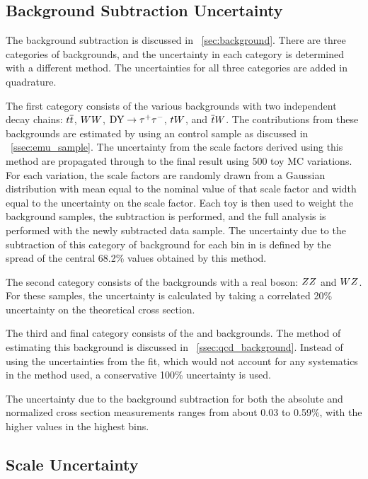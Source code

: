 \subsection{Background Subtraction Uncertainty}
\label{ssec:background_subtraction_uncertainty}

The background subtraction is discussed in \SEC~\ref{sec:background}. There are
three categories of backgrounds, and the uncertainty in each category is
determined with a different method. The uncertainties for all three categories
are added in quadrature.

The first category consists of the various backgrounds with two independent
decay chains: $t\overline{t}$, $WW$, $\text{DY} \to \tau^{+} \tau^{-}$, $tW$, and $\overline{t}W$. The
contributions from these backgrounds are estimated by using an \emu control
sample as discussed in \SEC~\ref{ssec:emu_sample}. The uncertainty from the
scale factors derived using this method are propagated through to the final
result using 500 toy MC variations. For each variation, the scale factors are
randomly drawn from a Gaussian distribution with mean equal to the nominal
value of that scale factor and width equal to the uncertainty on the scale
factor. Each toy is then used to weight the background samples, the subtraction
is performed, and the full analysis is performed with the newly subtracted data
sample. The uncertainty due to the subtraction of this category of background
for each bin in \phistar is defined by the spread of the central 68.2\% values
obtained by this method.

The second category consists of the backgrounds with a real \Z boson: $ZZ$
and $WZ$. For these samples, the uncertainty is calculated by taking a
correlated 20\% uncertainty on the theoretical cross section.

The third and final category consists of the \QCDjets and \wjets
backgrounds. The method of estimating this background is discussed in
\SEC~\ref{ssec:qcd_background}. Instead of using the uncertainties from the
fit, which would not account for any systematics in the method used, a
conservative 100\% uncertainty is used.

The uncertainty due to the background subtraction for both the absolute and
normalized cross section measurements ranges from about 0.03 to 0.59\%, with
the higher values in the highest \phistar bins.

\subsection{\texorpdfstring{\pt}{PT} Scale Uncertainty}
\label{ssec:pt_scale_uncertainty}

